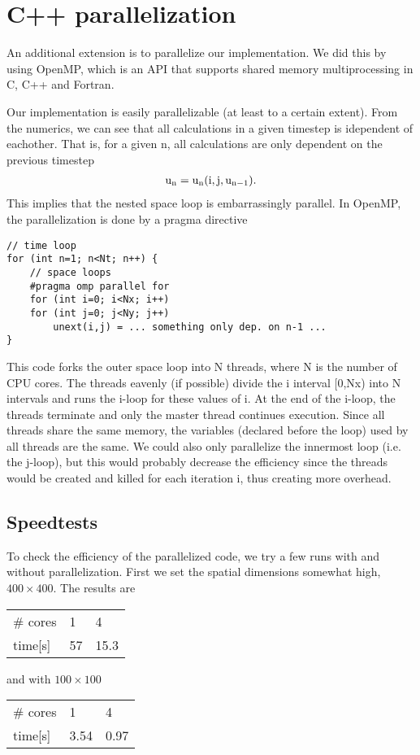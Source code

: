 \documentclass[a4paper,10pt]{article}
\renewcommand{\(}{\left(}
\renewcommand{\)}{\right)}
\begin{document}
\section{C++ parallelization}
An additional extension is to parallelize our implementation. We did this by using OpenMP, which is an API that supports shared memory multiprocessing in C, C++ and Fortran. 

Our implementation is easily parallelizable (at least to a certain extent). From the numerics, we can see that all calculations in a given timestep is idependent of eachother. That is, for a given n, all
calculations are only dependent on the previous timestep
\begin{align*}
\rm u_{\rm n} = \rm u_{\rm n }(\rm i, \rm j, u_{n-1}).
\end{align*}
This implies that the nested space loop is embarrassingly parallel. In OpenMP, the parallelization is done by a pragma directive
\begin{lstlisting}
// time loop
for (int n=1; n<Nt; n++) {
    // space loops
    #pragma omp parallel for
    for (int i=0; i<Nx; i++)
	for (int j=0; j<Ny; j++)
	    unext(i,j) = ... something only dep. on n-1 ...
}
\end{lstlisting}
This code forks the outer space loop into N threads, where N is the number of CPU cores. The threads eavenly (if possible) divide the i interval [0,Nx) into N intervals and runs the i-loop for these values of i.
At the end of the i-loop, the threads terminate and only the master thread continues execution. Since all threads share the same memory, the variables (declared before the loop) used by all threads are the same.
We could also only parallelize the innermost loop (i.e. the j-loop), but this would probably decrease the efficiency since the threads would be created and killed for each iteration i, 
thus creating more overhead.

\subsection{Speedtests}

To check the efficiency of the parallelized code, we try a few runs with and without parallelization. First we set the spatial dimensions somewhat high, $400 \times 400$. The results are

\begin{table}[position specifier]
\centering
\begin{tabular}{l| l| l}
\# cores & 1 & 4 \\
time[s] & 57 & 15.3 
\end{tabular}
\label{tab:table1}
\end{table}
and with $100 \times 100$
\begin{table}[position specifier]
\centering
\begin{tabular}{l l l}
\# cores & 1 & 4 \\
time[s] & 3.54 & 0.97
\end{tabular}
\label{tab:table1}
\end{table}
\end{document}
